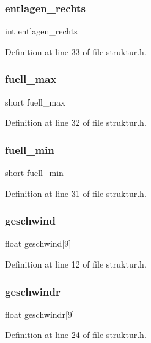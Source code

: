 \subsubsection{entlagen\+\_\+rechts}
{\footnotesize\ttfamily int entlagen\+\_\+rechts}



Definition at line 33 of file struktur.\+h.

\mbox{\label{structramp1_a9df4a75c4688ffd399d55125139634f8}} 
\subsubsection{fuell\+\_\+max}
{\footnotesize\ttfamily short fuell\+\_\+max}



Definition at line 32 of file struktur.\+h.

\mbox{\label{structramp1_ace793d2db6c5e9777a102d31fcb9800c}} 
\subsubsection{fuell\+\_\+min}
{\footnotesize\ttfamily short fuell\+\_\+min}



Definition at line 31 of file struktur.\+h.

\mbox{\label{structramp1_a37784a18505be76ac04444115d5b8413}} 
\subsubsection{geschwind}
{\footnotesize\ttfamily float geschwind[9]}



Definition at line 12 of file struktur.\+h.

\mbox{\label{structramp1_af92e34b5d008e6e648e17fdcd5772192}} 
\subsubsection{geschwindr}
{\footnotesize\ttfamily float geschwindr[9]}



Definition at line 24 of file struktur.\+h.

